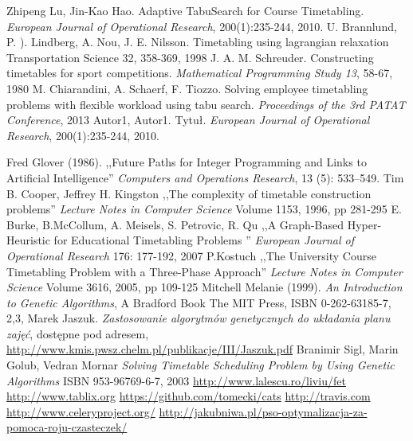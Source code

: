 \documentclass[11pt]{report}
\begin{document}
\begin{thebibliography}{2}
 Zhipeng Lu, Jin-Kao Hao. Adaptive TabuSearch for Course Timetabling.  \emph{European Journal of Operational Research}, 200(1):235-244, 2010.
 U. Brannlund, P. ). Lindberg, A. Nou, J. E. Nilsson. Timetabling using lagrangian relaxation Transportation Science 32, 358-369, 1998
 J. A. M. Schreuder. Constructing timetables for sport competitions. \emph{Mathematical Programming Study 13}, 58-67, 1980
 M. Chiarandini, A. Schaerf, F. Tiozzo. Solving employee timetabling problems with flexible workload using tabu search. \emph{Proceedings of the 3rd PATAT Conference}, 2013
 Autor1, Autor1. Tytuł.  \emph{European Journal of Operational Research}, 200(1):235-244, 2010.

 Fred Glover (1986). ,,Future Paths for Integer Programming and Links to Artificial Intelligence'' \emph{Computers and Operations Research}, 13 (5): 533–549.
 Tim B. Cooper, Jeffrey H. Kingston ,,The complexity of timetable construction problems''  \emph{Lecture Notes in Computer Science} Volume 1153, 1996, pp 281-295 
  E. Burke, B.McCollum, A. Meisels, S. Petrovic, R. Qu ,,A Graph-Based Hyper-Heuristic for Educational Timetabling Problems '' \emph{European Journal of Operational Research} 176: 177-192, 2007
 P.Kostuch ,,The University Course Timetabling Problem with a Three-Phase Approach'' \emph{
Lecture Notes in Computer Science} Volume 3616, 2005, pp 109-125
 Mitchell Melanie (1999). \emph{An Introduction to Genetic Algorithms}, A Bradford Book The MIT Press, ISBN 0-262-63185-7, 2,3,
 Marek Jaszuk. \emph{Zastosowanie algorytmów genetycznych do układania planu zajęć}, dostępne pod adresem, \url{http://www.kmis.pwsz.chelm.pl/publikacje/III/Jaszuk.pdf}
 Branimir Sigl, Marin Golub, Vedran Mornar \emph{Solving Timetable Scheduling Problem by Using Genetic Algorithms} ISBN 953-96769-6-7, 2003
 \url{http://www.lalescu.ro/liviu/fet}
 \url{http://www.tablix.org}
 \url{https://github.com/tomecki/cats}
 \url{http://travis.com}
 \url{http://www.celeryproject.org/}
 \url{http://jakubniwa.pl/pso-optymalizacja-za-pomoca-roju-czasteczek/}
\end{thebibliography}
\end{document}
